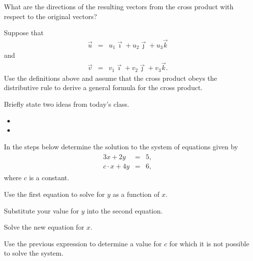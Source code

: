 \begin{problem}
\begin{subproblem}
  \item What are the directions of the resulting vectors from the cross product with respect to the original vectors?
    \vspace{2em}

    \clearpage

  \item Suppose that
    \begin{eqnarray*}
      \vec{u} & = & u_1 \vec{\imath} + u_2 \vec{\jmath} + u_3 \vec{k}
    \end{eqnarray*}
    and
    \begin{eqnarray*}
      \vec{v} & = & v_1 \vec{\imath} + v_2 \vec{\jmath} + v_3 \vec{k}.
    \end{eqnarray*}
    Use the definitions above and assume that the cross product obeys
    the distributive rule to derive a general formula for the cross product.
    \vfill

  \end{subproblem}
\end{problem}


\postClass

\begin{problem}
\item Briefly state two ideas from today's class.
  \begin{itemize}
  \item
  \item
  \end{itemize}
\item
  \begin{subproblem}
    \item
  \end{subproblem}
\end{problem}


\begin{problem}
\item In the steps below determine the solution to the system of equations given by
\begin{eqnarray*}
  \begin{array}{lcl}
    3x + 2y & = & 5, \\
    c \cdot x + 4y & = & 6,
  \end{array}
\end{eqnarray*}
where $c$ is a constant.
\begin{subproblem}
  \item Use the first equation to solve for $y$ as a function of $x$.
    \vfill
  \item Substitute your value for $y$ into the second equation.
    \vfill
  \item Solve the new equation for $x$.
    \vfill
  \item Use the previous expression to determine a value for $c$ for which it is not possible to solve the system.
    \vfill
\end{subproblem}
\end{problem}


